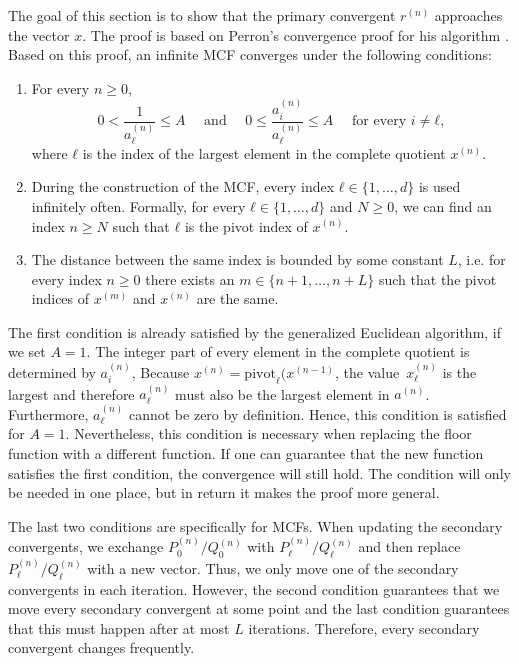 The goal of this section is to show that the primary convergent $r^{(n)}$ approaches the vector $x$.
The proof is based on Perron's convergence proof for his algorithm \cite{Perron07}.
Based on this proof, an infinite MCF converges under the following conditions:
\begin{enumerate}
  \item
    For every $n ≥ 0$,
    \[
      0 < \frac{1}{a_ℓ^{(n)}} ≤ A
      \quad \text{ and } \quad
      0 ≤ \frac{a_i^{(n)}}{a_ℓ^{(n)}} ≤ A \quad \text{ for every } i ≠ ℓ,
    \]
    where $ℓ$ is the index of the largest element in the complete quotient $x^{(n)}$.
  \item
    During the construction of the MCF,
    every index $ℓ ∈ \{1, …, d\}$ is used infinitely often.
    Formally, for every $ℓ ∈ \{1, …, d\}$ and $N ≥ 0$,
    we can find an index $n ≥ N$ such that $ℓ$ is the pivot index of $x^{(n)}$.
  \item
    The distance between the same index is bounded by some constant $L$,
    i.e. for every index $n ≥ 0$ there exists an $m ∈ \{n+1, …, n+L\}$ such that
    the pivot indices of $x^{(m)}$ and $x^{(n)}$ are the same.
\end{enumerate}

The first condition is already satisfied by the generalized Euclidean algorithm,
if we set $A = 1$.
The integer part of every element in the complete quotient is determined by $a_i^{(n)}$,
Because $x^{(n)} = \mathrm{pivot}_ℓ(x^{(n-1)}$,
the value~$x_ℓ^{(n)}$ is the largest and therefore $a_ℓ^{(n)}$ must also be the
largest element in $a^{(n)}$.
Furthermore, $a_ℓ^{(n)}$ cannot be zero by definition.
Hence, this condition is satisfied for $A = 1$.
Nevertheless,
this condition is necessary when replacing the floor function with a different
function.
If one can guarantee that the new function satisfies the first condition, the
convergence will still hold.
The condition will only be needed in one place,
but in return it makes the proof more general.

The last two conditions are specifically for MCFs.
When updating the secondary convergents,
we exchange $P_0^{(n)} / Q_0^{(n)}$ with $P_ℓ^{(n)}/Q_ℓ^{(n)}$
and then replace  $P_ℓ^{(n)}/Q_ℓ^{(n)}$ with a new vector.
Thus, we only move one of the secondary convergents in each iteration.
However, the second condition guarantees that we move every secondary
convergent at some point
and the last condition guarantees that this must happen after at most $L$ iterations.
Therefore, every secondary convergent changes frequently.

